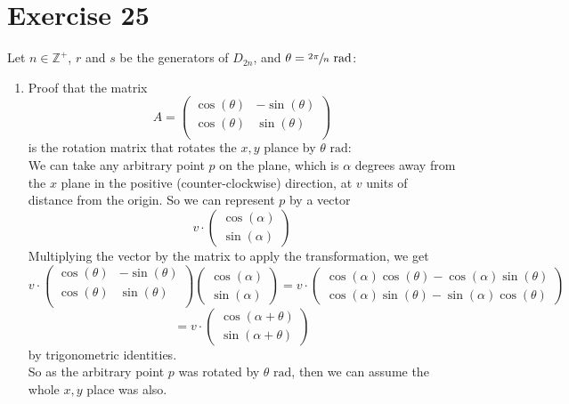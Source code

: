 \documentclass{article}
\newcommand{\Z}{\mathbb{Z}}
\newcommand{\rad}{\text{ rad}}
\begin{document}
    \section*{Exercise 25}
    Let $n \in \Z^+$, $r$ and $s$ be the generators of $D_{2n}$,
    and $\theta = \sfrac{2 \pi}{n} \rad$: \\
    \begin{enumerate}[label=\textbf{\alph*.}]
        \item 
            Proof that the matrix
            \[ A  = \begin{pmatrix}
                \cos(\theta) & -\sin(\theta) \\
                \cos(\theta) & \sin(\theta) \\
            \end{pmatrix} \]
            is the rotation matrix that rotates the $x, y$ plance
            by $\theta \rad$: \\
            We can take any arbitrary point $p$ on the plane,
            which is $\alpha$ degrees away from the $x$ plane in the positive
            (counter-clockwise) direction,
            at $v$ units of distance from the origin.
            So we can represent $p$ by a vector
            \[v \cdot \begin{pmatrix}
                \cos(\alpha) \\
                \sin(\alpha)
            \end{pmatrix} \]
            Multiplying the vector by the matrix to apply the transformation,
            we get
            \[ v \cdot \begin{pmatrix}
                \cos(\theta) & -\sin(\theta) \\
                \cos(\theta) & \sin(\theta) \\
            \end{pmatrix}
            \begin{pmatrix}
                \cos(\alpha) \\
                \sin(\alpha)
            \end{pmatrix} 
            = v \cdot \begin{pmatrix}
                \cos(\alpha)\cos(\theta) - \cos(\alpha)\sin(\theta) \\
                \cos(\alpha)\sin(\theta) - \sin(\alpha)\cos(\theta)
            \end{pmatrix} \]
            \[ = v \cdot \begin{pmatrix}
                \cos(\alpha + \theta) \\
                \sin(\alpha + \theta)
            \end{pmatrix} \]
            by trigonometric identities. \\
            So as the arbitrary point $p$ was rotated by $\theta \rad$,
            then we can assume the whole $x, y$ place was also.
            

\end{enumerate}
\end{document}
